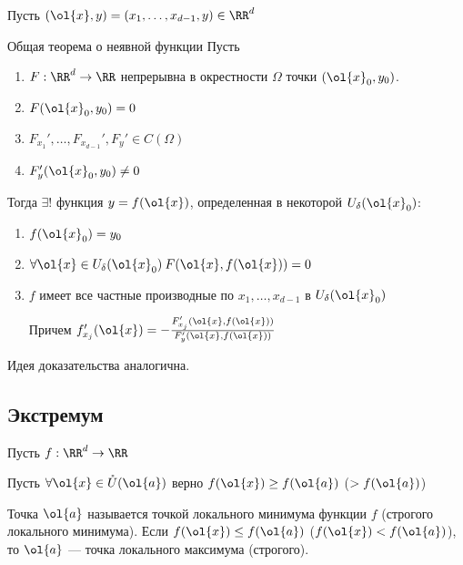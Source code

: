 Пусть \( (\ol{x}, y) = (x_1, \ldots, x_{d - 1}, y) \in \RR^d \)

\begin{thrm}{Общая теорема о неявной функции}{}
    Пусть
    \begin{enumerate}
        \item
            \( F : \RR^d \to \RR \) непрерывна в окрестности \( \Omega \) точки \( (\ol{x}_0, y_0) \).
        \item
            \( F(\ol{x}_0, y_0) = 0 \)
        \item
            \( F_{x_1}', \ldots, F_{x_{d - 1}}', F_y' \in C(\Omega) \)
        \item
            \( F_y' (\ol{x}_0, y_0) \neq 0 \)
    \end{enumerate}

    Тогда \( \exists! \) функция \( y = f(\ol{x}) \),
    определенная в некоторой \( U_{\delta} (\ol{x}_0) \):
    \begin{enumerate}
        \item
            \( f(\ol{x}_0) = y_0 \)
        \item
            \( \forall \ol{x} \in U_{\delta} (\ol{x}_0) \: F(\ol{x}, f(\ol{x})) = 0 \)
        \item
            \( f \) имеет все частные производные по \( x_1, \ldots, x_{d - 1} \) в \( U_{\delta}(\ol{x}_0) \)

            Причем \( f_{x_j}' (\ol{x}) = -\frac{F_{x_j}' (\ol{x}, f(\ol{x}))}{F_y' (\ol{x}, f(\ol{x}))} \)
    \end{enumerate}
\end{thrm}

Идея доказательства аналогична.

\newpage

\subsection{Экстремум}

\begin{defn}{}{}
    Пусть \( f : \RR^d \to \RR \)

    Пусть \( \forall \ol{x} \in \mathring{U} (\ol{a}) \) верно \( f(\ol{x}) \geq f(\ol{a}) \) (\( > f(\ol{a}) \))

    Точка \( \ol{a} \) называется точкой локального минимума функции \( f \) (строгого локального минимума).
    Если \( f(\ol{x}) \leq f(\ol{a}) \) (\( f(\ol{x}) < f(\ol{a})\)), то \( \ol{a} \) --- точка локального максимума (строгого).
\end{defn}

